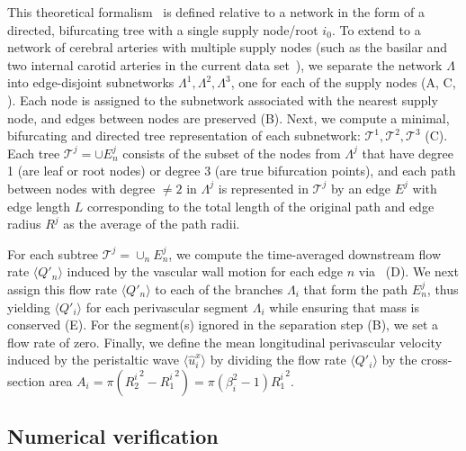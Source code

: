 

This theoretical formalism~\cite{gjerde2023directional} is defined
relative to a network in the form of a directed, bifurcating tree with
a single supply node/root $i_0$. To extend to a network of cerebral
arteries with multiple supply nodes (such as the basilar and two
internal carotid arteries in the current data
set~\cite{hodneland2019new}), we separate the network $\Lambda$ into
edge-disjoint subnetworks $\Lambda^1, \Lambda^2, \Lambda^3$, one for
each of the supply nodes (A, C,
). Each node is assigned to the subnetwork
associated with the nearest supply node, and edges between nodes are
preserved (B). Next, we compute a minimal,
bifurcating and directed tree representation of each subnetwork:
$\mathcal{T}^1, \mathcal{T}^2, \mathcal{T}^3$
(C). Each tree $\mathcal{T}^j = \cup E_n^j$
consists of the subset of the nodes from $\Lambda^j$ that have degree
1 (are leaf or root nodes) or degree $3$ (are true bifurcation
points), and each path between nodes with degree $\not = 2$ in
$\Lambda^j$ is represented in $\mathcal{T}^j$ by an edge $E^j$ with
edge length $L$ corresponding to the total length of the original path
and edge radius $R^j$ as the average of the path radii.

For each subtree $\mathcal{T}^j = \cup_n E_n^j$, we compute the
time-averaged downstream flow rate $\langle Q'_n \rangle$ induced by
the vascular wall motion for each edge $n$ via~\cite[eq.~(5),
  (34)]{gjerde2023directional} (D). We next
assign this flow rate $\langle Q'_n \rangle$ to each of the branches
$\Lambda_i$ that form the path $E_n^j$, thus yielding $\langle Q'_i
\rangle$ for each perivascular segment $\Lambda_i$ while ensuring that
mass is conserved (E). For the segment(s)
ignored in the separation step (B), we set a
flow rate of zero. Finally, we define the mean longitudinal
perivascular velocity induced by the peristaltic wave $\langle
\hat{u}^x_i \rangle$ by dividing the flow rate $\langle Q'_i \rangle$
by the cross-section area $A_i = \pi ({R_2^i}^2 - {R_1^i}^2) = \pi
(\beta_i^2 - 1) {R_1^i}^2$.

\subsection{Numerical verification}
\label{sec:app:verification}


